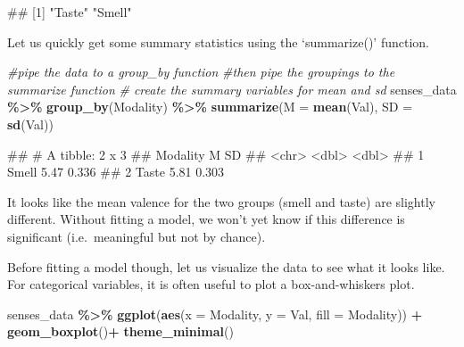 \documentclass[
]{book}
\newenvironment{Shaded}{\begin{snugshade}}{\end{snugshade}}
\newcommand{\AttributeTok}[1]{\textcolor[rgb]{0.13,0.29,0.53}{#1}}
\newcommand{\CommentTok}[1]{\textcolor[rgb]{0.56,0.35,0.01}{\textit{#1}}}
\newcommand{\FunctionTok}[1]{\textcolor[rgb]{0.13,0.29,0.53}{\textbf{#1}}}
\newcommand{\NormalTok}[1]{#1}
\newcommand{\SpecialCharTok}[1]{\textcolor[rgb]{0.81,0.36,0.00}{\textbf{#1}}}
\begin{document}
\begin{Shaded}
\begin{Highlighting}[]
\NormalTok{\#\# [1] "Taste" "Smell"}
\end{Highlighting}
\end{Shaded}

Let us quickly get some summary statistics using the `summarize()' function.

\begin{Shaded}
\begin{Highlighting}[]
\CommentTok{\#pipe the data to a group\_by function}
\CommentTok{\#then pipe the groupings to the summarize function}
\CommentTok{\# create the summary variables for mean and sd}
\NormalTok{senses\_data }\SpecialCharTok{\%\textgreater{}\%} \FunctionTok{group\_by}\NormalTok{(Modality) }\SpecialCharTok{\%\textgreater{}\%}
  \FunctionTok{summarize}\NormalTok{(}\AttributeTok{M =} \FunctionTok{mean}\NormalTok{(Val), }\AttributeTok{SD =} \FunctionTok{sd}\NormalTok{(Val))}
\end{Highlighting}
\end{Shaded}

\begin{Shaded}
\begin{Highlighting}[]
\NormalTok{\#\# \# A tibble: 2 x 3}
\NormalTok{\#\#   Modality     M    SD}
\NormalTok{\#\#   \textless{}chr\textgreater{}    \textless{}dbl\textgreater{} \textless{}dbl\textgreater{}}
\NormalTok{\#\# 1 Smell     5.47 0.336}
\NormalTok{\#\# 2 Taste     5.81 0.303}
\end{Highlighting}
\end{Shaded}

It looks like the mean valence for the two groups (smell and taste) are slightly different. Without fitting a model, we won't yet know if this difference is significant (i.e.~meaningful but not by chance).

Before fitting a model though, let us visualize the data to see what it looks like. For categorical variables, it is often useful to plot a box-and-whiskers plot.

\begin{Shaded}
\begin{Highlighting}[]
\NormalTok{senses\_data }\SpecialCharTok{\%\textgreater{}\%} \FunctionTok{ggplot}\NormalTok{(}\FunctionTok{aes}\NormalTok{(}\AttributeTok{x =}\NormalTok{ Modality, }\AttributeTok{y =}\NormalTok{ Val, }\AttributeTok{fill =}\NormalTok{ Modality)) }\SpecialCharTok{+} 
  \FunctionTok{geom\_boxplot}\NormalTok{()}\SpecialCharTok{+}
  \FunctionTok{theme\_minimal}\NormalTok{()}
\end{Highlighting}
\end{Shaded}
\end{document}
